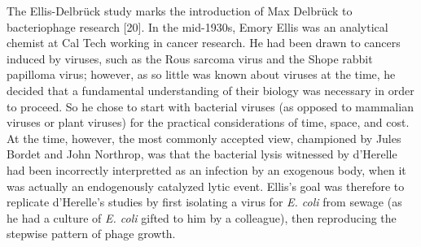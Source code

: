 \documentclass[12pt,twoside]{mitthesis-manusdown}
\begin{document}
The Ellis-Delbrück study marks the introduction of Max Delbrück to
bacteriophage research {[}20{]}. In the mid-1930s, Emory Ellis was an
analytical chemist at Cal Tech working in cancer research. He had been
drawn to cancers induced by viruses, such as the Rous sarcoma virus and
the Shope rabbit papilloma virus; however, as so little was known about
viruses at the time, he decided that a fundamental understanding of
their biology was necessary in order to proceed. So he chose to start
with bacterial viruses (as opposed to mammalian viruses or plant
viruses) for the practical considerations of time, space, and cost. At
the time, however, the most commonly accepted view, championed by Jules
Bordet and John Northrop, was that the bacterial lysis witnessed by
d'Herelle had been incorrectly interpretted as an infection by an
exogenous body, when it was actually an endogenously catalyzed lytic
event. Ellis's goal was therefore to replicate d'Herelle's studies by
first isolating a virus for \emph{E. coli} from sewage (as he had a
culture of \emph{E. coli} gifted to him by a colleague), then
reproducing the stepwise pattern of phage growth.
\end{document}
